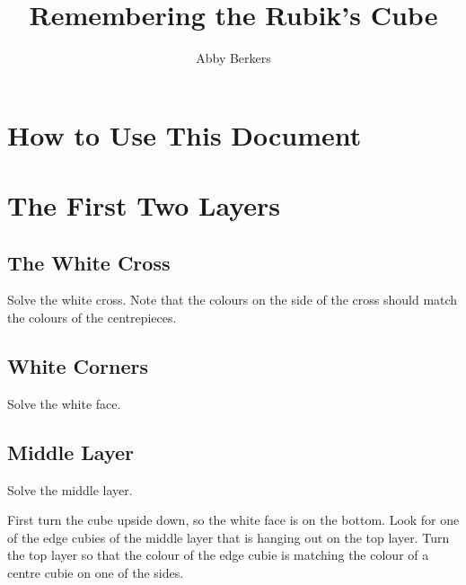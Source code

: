 \documentclass{article}
\title{Remembering the Rubik's Cube}
\author{Abby Berkers}
\begin{document}
    \maketitle
    \RubikCubeSolved
    \begin{minipage}{\textwidth}
        \centering
    \end{minipage}
    \clearpage

    \tableofcontents
    \clearpage

    \setcounter{section}{-1}
    \section{How to Use This Document}
    \section{The First Two Layers}

    \subsection{The White Cross}
    
    \begin{goal}
        Solve the white cross.
        Note that the colours on the side of the cross should match the colours of the centrepieces.
    \end{goal}


    \subsection{White Corners}
    
    \begin{goal}
        Solve the white face.
    \end{goal}


    \subsection{Middle Layer}
    
    \begin{goal}
        Solve the middle layer.
    \end{goal}

    First turn the cube upside down, so the white face is on the bottom.
    Look for one of the edge cubies of the middle layer that is hanging out on the top layer.
    Turn the top layer so that the colour of the edge cubie is matching the colour of a centre cubie on one of the sides.
\end{document}
